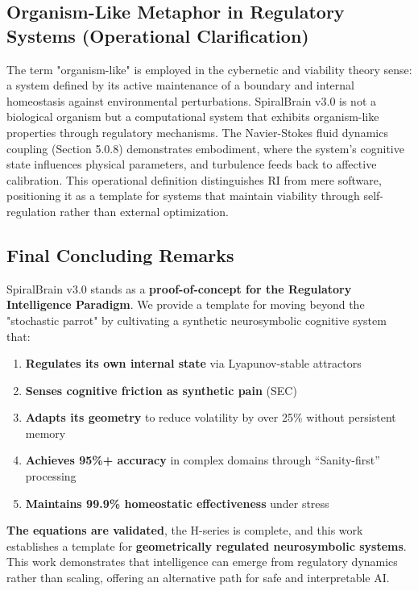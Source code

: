 \documentclass[12pt,a4paper]{report}
\begin{document}
\subsection{Organism-Like Metaphor in Regulatory Systems (Operational Clarification)}

The term "organism-like" is employed in the cybernetic and viability theory sense: a system defined by its active maintenance of a boundary and internal homeostasis against environmental perturbations. SpiralBrain v3.0 is not a biological organism but a computational system that exhibits organism-like properties through regulatory mechanisms. The Navier-Stokes fluid dynamics coupling (Section 5.0.8) demonstrates embodiment, where the system's cognitive state influences physical parameters, and turbulence feeds back to affective calibration. This operational definition distinguishes RI from mere software, positioning it as a template for systems that maintain viability through self-regulation rather than external optimization.

\subsection{Final Concluding Remarks}

SpiralBrain v3.0 stands as a \textbf{proof-of-concept for the Regulatory Intelligence Paradigm}. We provide a template for moving beyond the "stochastic parrot" by cultivating a synthetic neurosymbolic cognitive system that:

\begin{enumerate}
    \item \textbf{Regulates its own internal state} via Lyapunov-stable attractors
    \item \textbf{Senses cognitive friction as synthetic pain} (SEC)
    \item \textbf{Adapts its geometry} to reduce volatility by over 25\% without persistent memory
    \item \textbf{Achieves 95\%+ accuracy} in complex domains through ``Sanity-first'' processing
    \item \textbf{Maintains 99.9\% homeostatic effectiveness} under stress
\end{enumerate}

\textbf{The equations are validated}, the H-series is complete, and this work establishes a template for \textbf{geometrically regulated neurosymbolic systems}. This work demonstrates that intelligence can emerge from regulatory dynamics rather than scaling, offering an alternative path for safe and interpretable AI.
\end{document}
